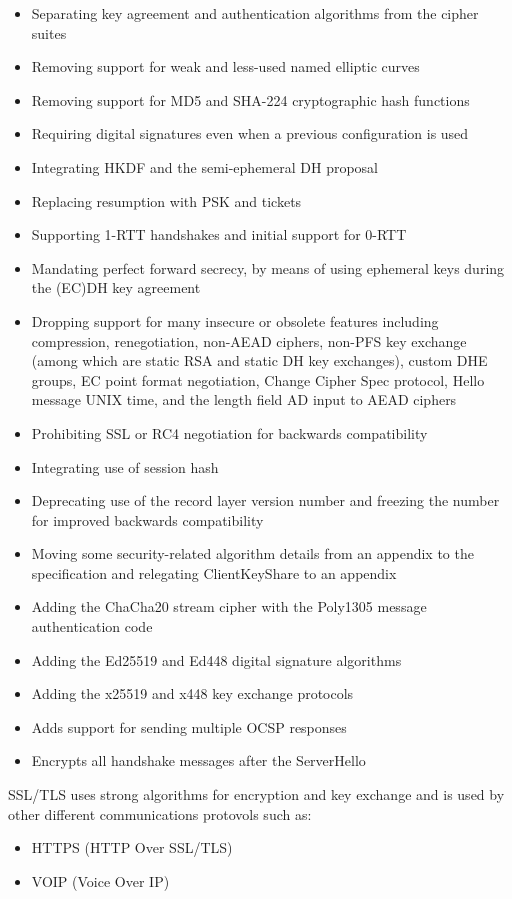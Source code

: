 \documentclass[letterpaper,12pt]{article}
\begin{document}
\begin{itemize}
\item Separating key agreement and authentication algorithms from the cipher suites
\item Removing support for weak and less-used named elliptic curves
\item Removing support for MD5 and SHA-224 cryptographic hash functions
\item Requiring digital signatures even when a previous configuration is used
\item Integrating HKDF and the semi-ephemeral DH proposal
\item Replacing resumption with PSK and tickets
\item Supporting 1-RTT handshakes and initial support for 0-RTT
\item Mandating perfect forward secrecy, by means of using ephemeral keys during the (EC)DH key agreement
\item Dropping support for many insecure or obsolete features including compression, renegotiation, non-AEAD ciphers, non-PFS key exchange (among which are static RSA and static DH key exchanges), custom DHE groups, EC point format negotiation, Change Cipher Spec protocol, Hello message UNIX time, and the length field AD input to AEAD ciphers
\item Prohibiting SSL or RC4 negotiation for backwards compatibility
\item Integrating use of session hash
\item Deprecating use of the record layer version number and freezing the number for improved backwards compatibility
\item Moving some security-related algorithm details from an appendix to the specification and relegating ClientKeyShare to an appendix
\item Adding the ChaCha20 stream cipher with the Poly1305 message authentication code
\item Adding the Ed25519 and Ed448 digital signature algorithms
\item Adding the x25519 and x448 key exchange protocols
\item Adds support for sending multiple OCSP responses
\item Encrypts all handshake messages after the ServerHello
\end{itemize}

SSL/TLS uses strong algorithms for encryption and key exchange and is used by other different communications protovols such as:
\begin{itemize}
    \item HTTPS (HTTP Over SSL/TLS)
    \item VOIP (Voice Over IP)
\end{itemize}
\end{document}
